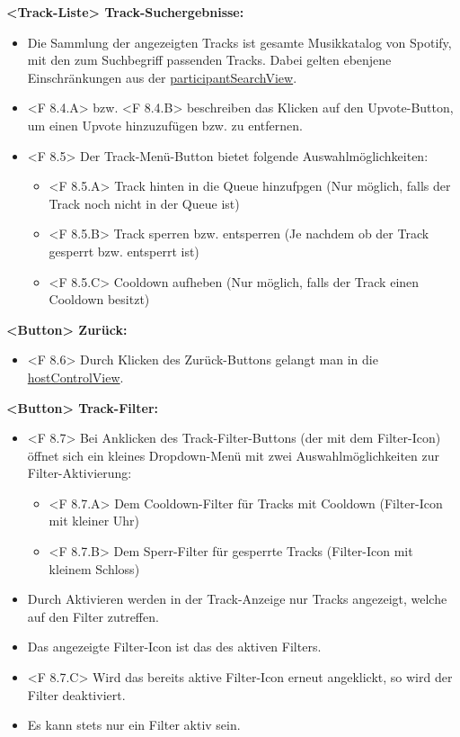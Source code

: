 \documentclass[oneside, ngerman]{sdqtechreport}
\begin{document}
\textbf{<Track-Liste> Track-Suchergebnisse:}
\begin{itemize}
    \item Die Sammlung der angezeigten Tracks ist gesamte Musikkatalog von Spotify, mit den zum Suchbegriff passenden Tracks. Dabei gelten ebenjene Einschränkungen aus der \hyperlink{participantSearchView}{participantSearchView}.
    \item <F 8.4.A> bzw. <F 8.4.B> beschreiben das Klicken auf den Upvote-Button, um einen Upvote hinzuzufügen bzw. zu entfernen.
    \item <F 8.5> Der Track-Menü-Button bietet folgende Auswahlmöglichkeiten:
    \begin{itemize}
        \item <F 8.5.A> Track hinten in die Queue hinzufpgen (Nur möglich, falls der Track noch nicht in der Queue ist)
        \item <F 8.5.B> Track sperren bzw. entsperren (Je nachdem ob der Track gesperrt bzw. entsperrt ist)
        \item <F 8.5.C> Cooldown aufheben (Nur möglich, falls der Track einen Cooldown besitzt)
    \end{itemize}
\end{itemize}

\textbf{<Button> Zurück:}
\begin{itemize}
    \item <F 8.6> Durch Klicken des Zurück-Buttons gelangt man in die  \hyperlink{hostControlView}{hostControlView}.
\end{itemize}

\textbf{<Button> Track-Filter:}
\begin{itemize}
    \item <F 8.7> Bei Anklicken des Track-Filter-Buttons (der mit dem Filter-Icon) öffnet sich ein kleines Dropdown-Menü mit zwei Auswahlmöglichkeiten zur Filter-Aktivierung:
    \begin{itemize}
        \item <F 8.7.A> Dem Cooldown-Filter für Tracks mit Cooldown (Filter-Icon mit kleiner Uhr)
        \item <F 8.7.B> Dem Sperr-Filter für gesperrte Tracks (Filter-Icon mit kleinem Schloss)
    \end{itemize}
    \item Durch Aktivieren werden in der Track-Anzeige nur Tracks angezeigt, welche auf den Filter zutreffen.
    \item Das angezeigte Filter-Icon ist das des aktiven Filters.
    \item <F 8.7.C> Wird das bereits aktive Filter-Icon erneut angeklickt, so wird der Filter deaktiviert.
    \item Es kann stets nur ein Filter aktiv sein.
\end{itemize}
\end{document}

